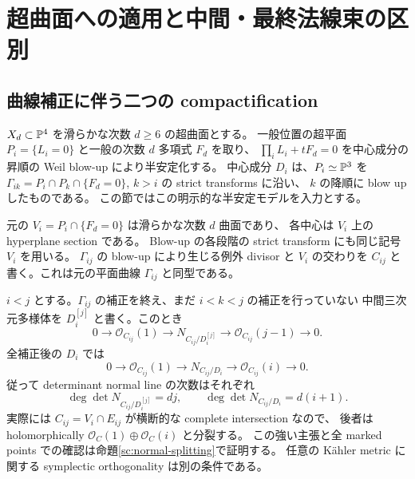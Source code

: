 \section{超曲面への適用と中間・最終法線束の区別}
\label{lc:application}

\subsection{曲線補正に伴う二つの compactification}

$X_d\subset\mathbb P^4$ を滑らかな次数 $d\ge6$ の超曲面とする。
一般位置の超平面 $P_i=\{L_i=0\}$ と一般の次数 $d$ 多項式 $F_d$ を取り、
$\prod_iL_i+tF_d=0$ を中心成分の昇順の Weil blow-up により半安定化する。
中心成分 $D_i$ は、$P_i\simeq\mathbb P^3$ を
$\Gamma_{ik}=P_i\cap P_k\cap\{F_d=0\}$, $k>i$ の strict transforms に沿い、
$k$ の降順に blow up したものである。
この節ではこの明示的な半安定モデルを入力とする。

元の $V_i=P_i\cap\{F_d=0\}$ は滑らかな次数 $d$ 曲面であり、
各中心は $V_i$ 上の hyperplane section である。
Blow-up の各段階の strict transform にも同じ記号 $V_i$ を用いる。
$\Gamma_{ij}$ の blow-up により生じる例外 divisor と $V_i$ の交わりを
$C_{ij}$ と書く。これは元の平面曲線 $\Gamma_{ij}$ と同型である。

\begin{proposition}
\label{lc:application-normal}
$i<j$ とする。$\Gamma_{ij}$ の補正を終え、まだ $i<k<j$ の補正を行っていない
中間三次元多様体を $D_i^{[j]}$ と書く。このとき
\[
0\longrightarrow\mathcal O_{C_{ij}}(1)
\longrightarrow N_{C_{ij}/D_i^{[j]}}
\longrightarrow\mathcal O_{C_{ij}}(j-1)\longrightarrow0.
\]
全補正後の $D_i$ では
\begin{equation}\label{lc:application-final-exact}
0\longrightarrow\mathcal O_{C_{ij}}(1)
\longrightarrow N_{C_{ij}/D_i}
\longrightarrow\mathcal O_{C_{ij}}(i)\longrightarrow0.
\end{equation}
従って determinant normal line の次数はそれぞれ
\begin{equation}\label{lc:application-degree}
\deg\det N_{C_{ij}/D_i^{[j]}}=dj,\qquad
\deg\det N_{C_{ij}/D_i}=d(i+1).
\end{equation}
実際には $C_{ij}=V_i\cap E_{ij}$ が横断的な complete intersection なので、
後者は holomorphically $\mathcal O_C(1)\oplus\mathcal O_C(i)$ と分裂する。
この強い主張と全 marked points での確認は命題\ref{sc:normal-splitting}で証明する。
任意の Kähler metric に関する symplectic orthogonality は別の条件である。
\end{proposition}


